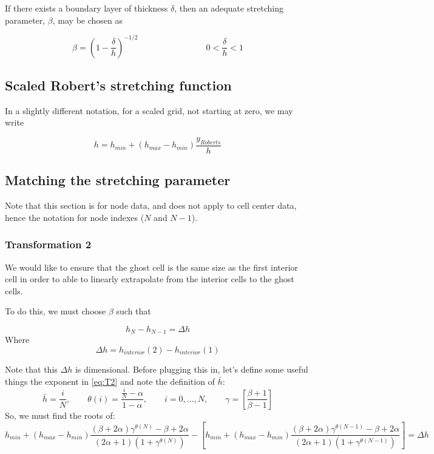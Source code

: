 \documentclass[11pt]{article}
\newcommand{\gammadef}{\left[\frac{\beta+1}{\beta-1}\right]}
\newcommand{\g}{\gamma}
\begin{document}
If there exists a boundary layer of thickness $\delta$, then an adequate stretching parameter, $\beta$, may be chosen as

\begin{equation}
	\beta = \left( 1 - \frac{\delta}{h} \right)^{-1/2}
	\qquad \qquad
	\qquad \qquad
	0 < \frac{\delta}{h} < 1
\end{equation}


\subsection{Scaled Robert's stretching function}
In a slightly different notation, for a scaled grid, not starting at zero, we may write

\begin{equation}
	h = h_{min} + (h_{max}-h_{min}) \frac{y_{Roberts}}{h}
\end{equation}

\subsection{Matching the stretching parameter}
Note that this section is for node data, and does not apply to cell center data, hence the notation for node indexes ($N$ and $N-1$).

\subsubsection{Transformation 2}
We would like to ensure that the ghost cell is the same size as the first interior cell in order to able to linearly extrapolate from the interior cells to the ghost cells.

To do this, we must choose $\beta$ such that

\begin{equation}
	h_{N} - h_{N-1} = \Delta h
\end{equation}
Where
\begin{equation}
	\Delta h = h_{interior}(2) - h_{interior}(1)
\end{equation}

Note that this $\Delta h$ is dimensional. Before plugging this in, let's define some useful things the exponent in \ref{eq:T2} and note the definition of $\bar{h}$:
\begin{equation}
	\bar{h} = \frac{i}{N}, \qquad
	\theta(i) = \frac{\frac{i}{N} - \alpha}{1 - \alpha},
	\qquad i=0,...,N,
	\qquad \g = \gammadef
\end{equation}
So, we must find the roots of:
\begin{equation}
	h_{min} + (h_{max}-h_{min}) \frac{(\beta+2\alpha)\g^{\theta(N)} - \beta + 2\alpha}{(2\alpha+1)\left(1+\g^{\theta(N)} \right)}
	-
	\left[
	h_{min} + (h_{max}-h_{min}) \frac{(\beta+2\alpha)\g^{\theta(N-1)} - \beta + 2\alpha}{(2\alpha+1)\left(1+\g^{\theta(N-1)} \right)}
	\right]
	=
	\Delta h
\end{equation}
\end{document}
